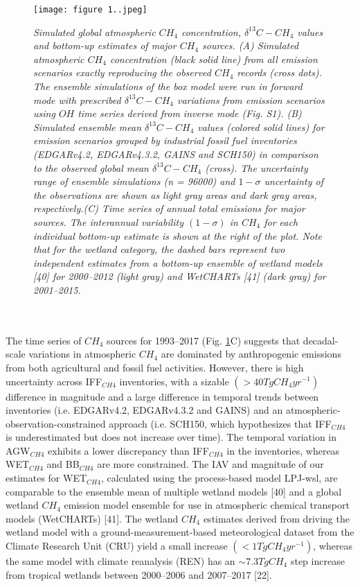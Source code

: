 \documentclass[a4paper,12pt]{article}
\begin{document}
\begin{figure}[H]
    \caption{}
    \texttt{[image: figure 1..jpeg]}
    \label{fig1:my_label}





\textit{\scriptsize{Simulated global atmospheric $CH_{4}$ concentration, $\delta^{13}$$C-CH_{4}$ values and bottom-up estimates of major $CH_{4}$ sources. (A) Simulated atmospheric $CH_{4}$ concentration (black solid line) from all emission scenarios exactly reproducing the observed $CH_{4}$ records (cross dots). The ensemble simulations of the box model were run in forward mode with prescribed $\delta^{13}$$C-CH_{4}$ variations from emission scenarios using $OH$ time series derived from inverse mode (Fig. S1). (B) Simulated ensemble mean $\delta^{13}$$C-CH_{4}$ values (colored solid lines) for emission scenarios grouped by industrial fossil fuel inventories (EDGARv4.2, EDGARv4.3.2, GAINS and SCH150) in comparison to the observed global mean $\delta^{13}$$C-CH_{4}$ (cross). The uncertainty range of ensemble simulations (n = 96000) and $1-\sigma$ uncertainty of the observations are shown as light gray areas and dark gray areas, respectively.(C) Time series of annual total emissions for major sources. The interannual variability $(1-\sigma)$ in $CH_{4}$  for each individual bottom-up estimate is shown at the right of the plot. Note that for the wetland category, the dashed bars represent two independent estimates from a bottom-up ensemble of wetland models [40] for 2000–2012 (light gray) and WetCHARTs [41] (dark gray) for 2001–2015.}}
\end{figure}
\\\\
\small{The time series of $CH_{4}$ sources for 1993–2017 (Fig. \ref{fig1:my_label}C) suggests that decadal-scale variations in atmospheric $CH_{4}$ are dominated by anthropogenic emissions from both agricultural and fossil fuel activities. However, there is high uncertainty across IFF$_{CH4}$ inventories, with a sizable $(>40Tg CH_{4}yr^{-1})$ difference in magnitude and a large difference in temporal trends between inventories (i.e. EDGARv4.2, EDGARv4.3.2 and GAINS) and an atmospheric-observation-constrained approach (i.e. SCH150, which hypothesizes that IFF$_{CH4}$ is underestimated but does not increase over time). The temporal variation in AGW$_{CH4}$ exhibits a lower discrepancy than IFF$_{CH4}$ in the inventories, whereas WET$_{CH4}$ and BB$_{CH4}$ are more constrained. The IAV and magnitude of our estimates for WET$_{CH4}$, calculated using the process-based model LPJ-wsl, are comparable to the ensemble mean of multiple wetland models [40] and a global wetland $CH_{4}$ emission model ensemble for use in atmospheric chemical transport models (WetCHARTs) [41]. The wetland $CH_{4}$ estimates derived from driving the wetland model with a ground-measurement-based meteorological dataset from the Climate Research Unit (CRU) yield a small increase $(<1Tg CH_{4}yr^{-1})$, whereas the same model with climate reanalysis (REN) has an $ \sim7.3 TgCH_{4}$ step increase from tropical wetlands between 2000–2006 and 2007–2017 [22].}
\end{document}
